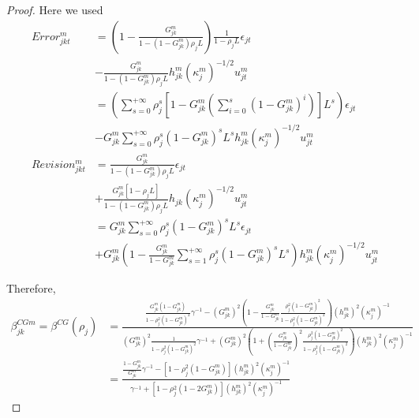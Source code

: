 \begin{proof}
Here we used
{\footnotesize
$$\begin{array}{ll}
 Error_{jkt}^m&=\left(1-\frac{G_{jk}^m}{1-(1-G_{jk}^m)\rho_{j}L}\right)\frac{1}{1-\rho_{j}L}\epsilon_{jt}\\
&-\frac{G_{jk}^m}{1-(1-G_{jk}^m)\rho_{j}L}h_{jk}^m(\kappa_j^m)^{-1/2}u_{jt}^m\\
&=\left(\sum_{s=0}^{+\infty}\rho_{j}^s\left[1-G_{jk}^m\left(\sum_{i=0}^s(1-G_{jk}^m)^i\right)\right]L^s\right)\epsilon_{jt}\\
&-G_{jk}^m\sum_{s=0}^{+\infty}\rho_{j}^s(1-G_{jk}^m)^sL^sh_{jk}^m(\kappa_j^m)^{-1/2}u_{jt}^m\\
 Revision_{jkt}^m&=\frac{G_{jk}^m}{1-(1-G_{jk}^m)\rho_{j}L}\epsilon_{jt}\\
&+\frac{G_{jk}^m[1-\rho_{j}L]}{1-(1-G_{jk}^m)\rho_{j}L}h_{jk}(\kappa_j^m)^{-1/2}u_{jt}^m\\
&=G_{jk}^m\sum_{s=0}^{+\infty}\rho_{j}^s(1-G_{jk}^m)^sL^s\epsilon_{jt}\\
&+G_{jk}^m\left(1-\frac{G_{jk}^m}{1-G_{jk}^m}\sum_{s=1}^{+\infty}\rho_{j}^{s}(1-G_{jk}^m)^sL^{s}\right)h_{jk}^m(\kappa_j^m)^{-1/2}u_{jt}^m
\end{array}$$
}

Therefore,
$$\begin{array}{ll}\beta^{CGm}_{jk} = \beta^{CG}(\rho_j) &= \frac{\frac{G_{jk}^m(1-G_{jk}^m)}{1-\rho_j^2(1-G_{jk}^m)^2}\gamma^{-1} -(G_{jk}^m)^2\left(1-\frac{G_{jk}^m}{1-G_{jk}^m}\frac{\rho_j^{2}(1-G_{jk}^m)^{2}}{1-\rho_j^{2}(1-G_{jk}^m)^{2}}\right)(h_{jk}^m)^2(\kappa_j^m)^{-1}}{(G_{jk}^m)^2\frac{1}{1-\rho_j^2(1-G_{jk}^m)^2}\gamma^{-1} + (G_{jk}^m)^2\left(1+\left(\frac{G_{jk}^m}{1-G_{jk}^m}\right)^2\frac{\rho_j^{2}(1-G_{jk}^m)^{2}}{1-\rho_j^{2}(1-G_{jk}^m)^{2}}\right)(h_{jk}^m)^2(\kappa_j^m)^{-1}}\\
																		&= \frac{\frac{1-G_{jk}^m}{G_{jk}^m}\gamma^{-1} -[1-\rho_j^2(1-G_{jk}^m)](h_{jk}^m)^2(\kappa_j^m)^{-1}}{\gamma^{-1} + [1-\rho_j^2(1-2G_{jk}^m)](h_{jk}^m)^2(\kappa_j^m)^{-1}}
\end{array}$$


\end{proof}

